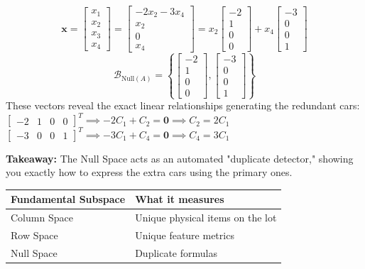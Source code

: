 \documentclass[DIV=20,oneside]{scrartcl}
\newcommand{\takeaway}[1]{%
	\begin{tcolorbox}[
		colback=black!20,
		colframe=black,
		boxrule=0.5pt,
		arc=2mm]
		\textbf{Takeaway: } #1
	\end{tcolorbox}
}
\begin{document}
$$\mathbf{x} = \begin{bmatrix} x_1 \\ x_2 \\ x_3 \\ x_4 \end{bmatrix} = \begin{bmatrix} -2x_2 - 3x_4 \\ x_2 \\ 0 \\ x_4 \end{bmatrix} = x_2 \begin{bmatrix} -2 \\ 1 \\ 0 \\ 0 \end{bmatrix} + x_4 \begin{bmatrix} -3 \\ 0 \\ 0 \\ 1 \end{bmatrix}$$$$\mathcal{B}_{\text{Null}(A)} = \left\{ \begin{bmatrix} -2 \\ 1 \\ 0 \\ 0 \end{bmatrix}, \begin{bmatrix} -3 \\ 0 \\ 0 \\ 1 \end{bmatrix} \right\}$$
These vectors reveal the exact linear relationships generating the redundant cars:\\
$\begin{bmatrix} -2 & 1 & 0 & 0 \end{bmatrix}^T \implies -2 C_1 + C_2 = \mathbf{0} \implies C_2 = 2C_1$\\
$\begin{bmatrix} -3 & 0 & 0 & 1 \end{bmatrix}^T \implies -3 C_1 + C_4 = \mathbf{0} \implies C_4 = 3C_1$
\takeaway{The Null Space acts as an automated "duplicate detector," showing you exactly how to express the extra cars using the primary ones.
\begin{center}
	\begin{tabular}{|l|l|}
	\hline
	\textbf{Fundamental Subspace} & \textbf{What it measures} \\
	\hline
	Column Space & Unique physical items on the lot \\
	\hline
	Row Space & Unique feature metrics \\
	\hline
	Null Space & Duplicate formulas \\
	\hline
\end{tabular}
\end{center}}
\end{document}
